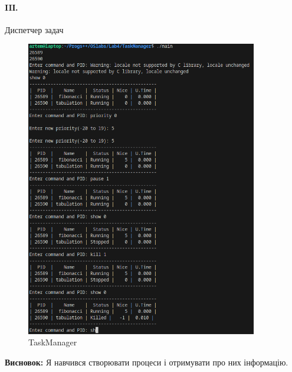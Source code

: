 \documentclass[12pt]{extarticle}
\begin{document}
\paragraph{IIІ.}Диспетчер задач

\begin{figure}[H]
    \centering
    \includegraphics[width=0.90\textwidth]{task.png}
    \caption{TaskManager}
\end{figure}
\textbf{Висновок:}
Я навчився створювати процеси і отримувати про них інформацію.
 
\end{document}
